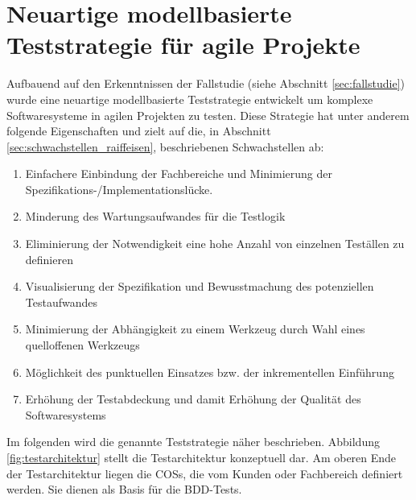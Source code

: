 \chapter{Neuartige modellbasierte Teststrategie für agile Projekte}
\label{sec:results}

Aufbauend auf den Erkenntnissen der Fallstudie (siehe Abschnitt \ref{sec:fallstudie}) wurde eine neuartige modellbasierte Teststrategie entwickelt um komplexe Softwaresysteme in agilen Projekten zu testen. Diese Strategie hat unter anderem folgende Eigenschaften und zielt auf die, in Abschnitt \ref{sec:schwachstellen_raiffeisen}, beschriebenen Schwachstellen ab:

\begin{enumerate}
\item Einfachere Einbindung der Fachbereiche und Minimierung der Spezifikations-/Implementationslücke.
\item Minderung des Wartungsaufwandes für die Testlogik
\item Eliminierung der Notwendigkeit eine hohe Anzahl von einzelnen Teställen zu definieren
\item Visualisierung der Spezifikation und Bewusstmachung des potenziellen Testaufwandes
\item Minimierung der Abhängigkeit zu einem Werkzeug durch Wahl eines quelloffenen Werkzeugs
\item Möglichkeit des punktuellen Einsatzes bzw. der inkrementellen Einführung
\item Erhöhung der Testabdeckung und damit Erhöhung der Qualität des Softwaresystems
\end{enumerate}

Im folgenden wird die genannte Teststrategie näher beschrieben. Abbildung \ref{fig:testarchitektur} stellt die Testarchitektur konzeptuell dar. Am oberen Ende der Testarchitektur liegen die \glspl{COS}, die vom Kunden oder Fachbereich definiert werden. Sie dienen als Basis für die BDD-Tests. 

